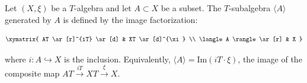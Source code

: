 Let $(X, \xi)$ be a $T$-algebra and let $A \subset X$ be a subset. The $T$-subalgebra $\langle A \rangle$ generated by $A$ is defined by the image factorization:

$$\xymatrix{
AT \ar[r]^{iT} \ar[d] & XT \ar[d]^{\xi} \\
\langle A \rangle \ar[r] & X
}$$

where $i: A \hookrightarrow X$ is the inclusion. Equivalently, $\langle A \rangle = \mathrm{Im}(iT \cdot \xi)$, the image of the composite map $AT \xrightarrow{iT} XT \xrightarrow{\xi} X$.
